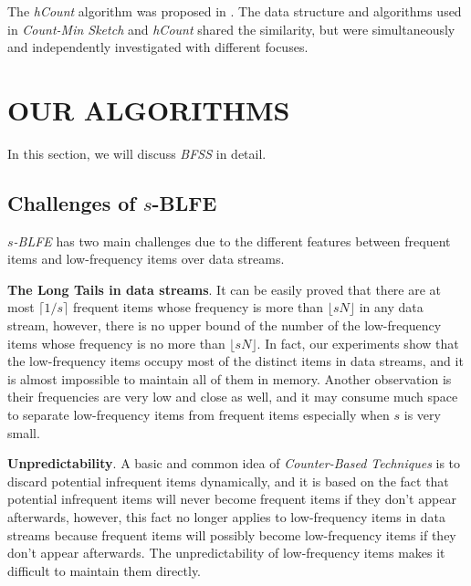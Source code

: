 \documentclass[conference]{IEEEtran}
\begin{document}
The \emph{hCount} algorithm was proposed in \cite{IEEEexample:hcount}. The data structure and algorithms used in \emph{Count-Min Sketch} and \emph{hCount} shared the similarity, but were simultaneously and independently investigated with different focuses.

\section{OUR ALGORITHMS}
In this section, we will discuss \emph{BFSS} in detail.
\subsection{Challenges of $s$-BLFE}
$s$\emph{-BLFE} has two main challenges due to the different features between frequent items and low-frequency items over data streams.\par

\textbf{The Long Tails in data streams}. It can be easily proved that there are at most $\lceil1/s\rceil$ frequent items whose frequency is more than $\lfloor sN\rfloor$ in any data stream, however, there is no upper bound of the number of the low-frequency items whose frequency is no more than $\lfloor sN\rfloor$. In fact, our experiments show that the low-frequency items occupy most of the distinct items in data streams, and it is almost impossible to maintain all of them in memory. Another observation is their frequencies are very low and close as well, and it may consume much space to separate low-frequency items from frequent items especially when $s$ is very small.\par

\textbf{Unpredictability}. A basic and common idea of \emph{Counter-Based Techniques} is to discard potential infrequent items dynamically, and it is based on the fact that potential infrequent items will never become frequent items if they don't appear afterwards, however, this fact no longer applies to low-frequency items in data streams because frequent items will possibly become low-frequency items if they don't appear afterwards. The unpredictability of low-frequency items makes it difficult to maintain them directly.
\end{document}
